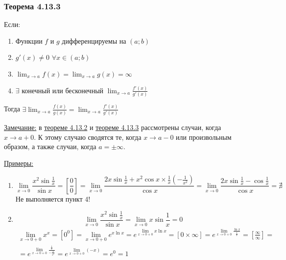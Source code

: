 \documentclass[12pt]{article}
\begin{document}
    \subsubsection*{Теорема 4.13.3}\label{th:4.13.3}
    \noindent Если: \begin{enumerate}
        \item Функции $f$ и $g$ дифференцируемы на $(a;b)$
        \item $g'(x) \ne 0$ $\forall x \in (a;b)$
        \item $\lim_{x\to a} f(x) = \lim_{x\to a}g(x) = \infty$
        \item $\exists$ конечный или бесконечный $\lim_{x\to a} \frac{f'(x)}{g'(x)}$
    \end{enumerate}
    Тогда $\exists \lim_{x\to a}\frac{f(x)}{g(x)} = \lim_{x\to a}\frac{f'(x)}{g'(x)}$\par\noindent
    \underline{Замечание:} в \hyperref[th:4.13.2]{теореме 4.13.2} и \hyperref[th:4.13.3]{теореме 4.13.3} рассмотрены случаи, когда $x \to a + 0$. К этому случаю сводятся те, когда $x \to a - 0$ или произвольным образом, а также случаи, когда $a = \pm \infty$.\par\noindent
    \underline{Примеры:} \begin{enumerate}
        \item \[ \lim_{x\to 0} \frac{x^2 \sin \frac{1}{x}}{\sin x} = \left[\frac{0}{0}\right] = \lim_{x\to 0}\frac{2x \sin \frac{1}{x} + x^2 \cos x \times \frac{1}{x} (-\frac{1}{x^2})}{\cos x} = \lim_{x\to 0} \frac{2x \sin \frac{1}{x} - \cos \frac{1}{x}}{\cos x} = \nexists \]
        Не выполняется пункт 4!
        \item \[ \lim_{x\to 0}\frac{x^2 \sin \frac{1}{x}}{\sin x} = \lim_{x\to 0}x \sin \frac{1}{x} = 0 \]
        \begin{gather*}
            \lim_{x\to 0+0}x^x = \left[0^0\right] = \lim_{x\to 0 + 0}e^{x\ln x} = e^{\lim_{x\to 0 + 0}x \ln x} = \left[ 0 \times \infty \right] = e^{\lim_{x\to 0 + 0}\frac{\ln x}{\frac{1}{x}}} = \left[ \frac{\infty}{\infty} \right] =\\= e^{\lim_{x\to 0 + 0}\frac{\frac{1}{x}}{-\frac{1}{x^2}}} = e^{\lim_{x\to 0 + 0}(-x)} = e^0 = 1
        \end{gather*}
    \end{enumerate} 
\end{document}
